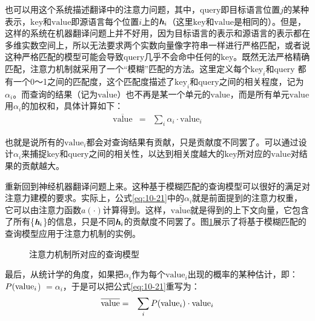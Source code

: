 \parinterval 也可以用这个系统描述翻译中的注意力问题，其中，$\mathrm{query}$即目标语言位置$j$的某种表示，$\mathrm{key}$和$\mathrm{value}$即源语言每个位置$i$上的${\textbf{\em h}_i}$（这里$\mathrm{key}$和$\mathrm{value}$是相同的）。但是，这样的系统在机器翻译问题上并不好用，因为目标语言的表示和源语言的表示都在多维实数空间上，所以无法要求两个实数向量像字符串一样进行严格匹配，或者说这种严格匹配的模型可能会导致$\mathrm{query}$几乎不会命中任何的$\mathrm{key}$。既然无法严格精确匹配，注意力机制就采用了一个“模糊”匹配的方法。这里定义每个$\mathrm{key}_i$和$\mathrm{query}$ 都有一个0～1之间的匹配度，这个匹配度描述了$\mathrm{key}_i$和$\mathrm{query}$之间的相关程度，记为$\alpha_i$。而查询的结果（记为$\overline{\mathrm{value}}$）也不再是某一个单元的$\mathrm{value}$，而是所有单元$\mathrm{value}$用$\alpha_i$的加权和，具体计算如下：
\begin{eqnarray}
\overline{\mathrm{value}} &=& \sum_i \alpha_i \cdot {\mathrm{value}}_i
\label{eq:10-21}
\end{eqnarray}

\noindent 也就是说所有的$\mathrm{value}_i$都会对查询结果有贡献，只是贡献度不同罢了。可以通过设计$\alpha_i$来捕捉$\mathrm{key}$和$\mathrm{query}$之间的相关性，以达到相关度越大的$\mathrm{key}$所对应的$\mathrm{value}$对结果的贡献越大。

\parinterval 重新回到神经机器翻译问题上来。这种基于模糊匹配的查询模型可以很好的满足对注意力建模的要求。实际上，公式\eqref{eq:10-21}中的$\alpha_i$就是前面提到的注意力权重，它可以由注意力函数$a(\cdot)$计算得到。这样，$\overline{\mathrm{value}}$就是得到的上下文向量，它包含了所有\{$\textbf{\em h}_i$\}的信息，只是不同$\textbf{\em h}_i$的贡献度不同罢了。图\ref{fig:10-23}展示了将基于模糊匹配的查询模型应用于注意力机制的实例。

\begin{figure}[htp]
\centering

\caption{注意力机制所对应的查询模型}
\label{fig:10-23}
\end{figure}

\parinterval 最后，从统计学的角度，如果把$\alpha_i$作为每个$\mathrm{value}_i$出现的概率的某种估计，即：$ {P} (\mathrm{value}_i$) $= \alpha_i$，于是可以把公式\eqref{eq:10-21}重写为：
\begin{eqnarray}
\overline{\mathrm{value}} &=& \sum_i {P} ( {\mathrm{value}}_i) \cdot {\mathrm{value}}_i
\label{eq:10-22}
\end{eqnarray}

